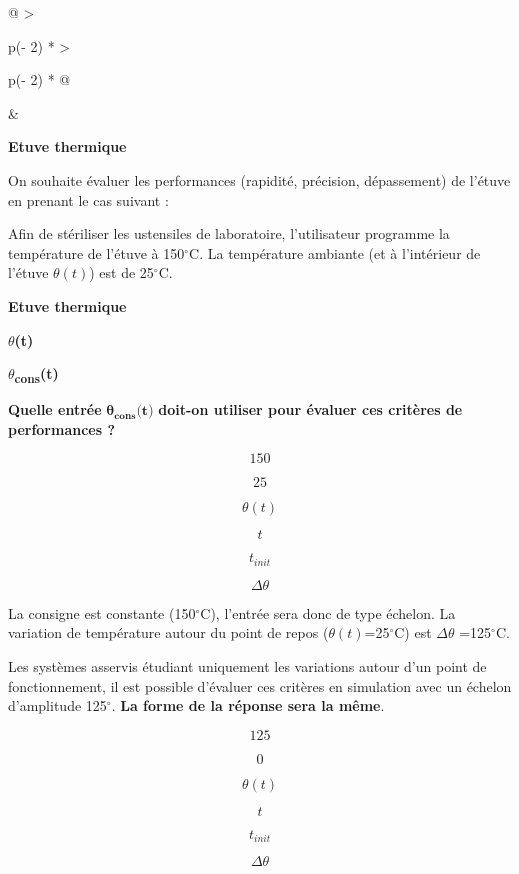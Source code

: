 \begin{longtable}[]{@{}
  >{\raggedright\arraybackslash}p{(\columnwidth - 2\tabcolsep) * }
  >{\raggedright\arraybackslash}p{(\columnwidth - 2\tabcolsep) * }@{}}
\toprule\noalign{}
\begin{minipage}[b]{\linewidth}\raggedright
\begin{quote}
\end{quote}
\end{minipage} & \begin{minipage}[b]{\linewidth}\raggedright
{}\textbf{Etuve
thermique}

On souhaite évaluer les performances (rapidité, précision, dépassement)
de l'étuve en prenant le cas suivant :

Afin de stériliser les ustensiles de laboratoire, l'utilisateur
programme la température de l'étuve à 150$^\circ$C. La température ambiante (et
à l'intérieur de l'étuve \(\theta(t)\)) est de 25$^\circ$C.

\textbf{Etuve thermique}

\textbf{$\theta$(t)}

\textbf{$\theta$\textsubscript{cons}(t)}

\textbf{Quelle entrée}
\(\mathbf{\theta}_{\mathbf{cons}}\mathbf{(}\mathbf{t}\mathbf{)}\)
\textbf{doit-on utiliser pour évaluer ces critères de performances ?}

\[150\]

\[25\]

\[\theta(t)\]

\[t\]

\[t_{init}\]

\[\Delta\theta\]

La consigne est constante (150$^\circ$C), l'entrée sera donc de type échelon.
La variation de température autour du point de repos
(\(\theta(t)\)=25$^\circ$C) est \(\Delta\theta\) =125$^\circ$C.

Les systèmes asservis étudiant uniquement les variations autour d'un
point de fonctionnement, il est possible d'évaluer ces critères en
simulation avec un échelon d'amplitude 125$^\circ$. \textbf{La forme de la
réponse sera la même}.

\[125\]

\[0\]

\[\theta(t)\]

\[t\]

\[t_{init}\]

\[\Delta\theta\]
\end{minipage} \\
\midrule\noalign{}
\endhead
\bottomrule\noalign{}
\endlastfoot
\end{longtable}

